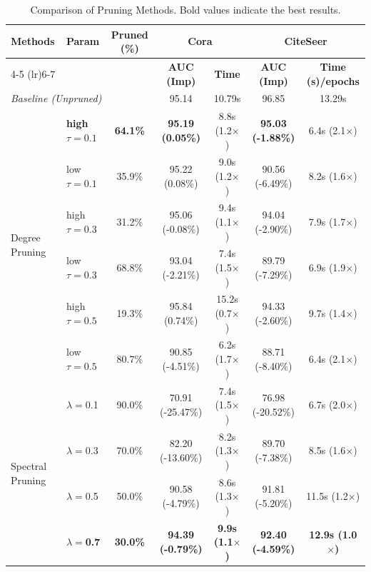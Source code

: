 \documentclass[pdflatex,sn-mathphys-num]{sn-jnl}%
\theoremstyle{thmstyleone}%
\theoremstyle{thmstyletwo}%
\theoremstyle{thmstylethree}%
\theoremstyle{plain} %
\theoremstyle{definition} %
\theoremstyle{remark} %
\theoremstyle{plain} %
\begin{document}
\begin{table}[ht]
\centering
\caption{Comparison of Pruning Methods. Bold values indicate the best results.}
\label{tab:pruning_results}

\footnotesize 
\setlength{\tabcolsep}{3.5pt} 
\renewcommand{\arraystretch}{1.1}

\begin{tabular}{llccccc}
\toprule

\multirow{2}{*}{\textbf{Methods}} & \multirow{2}{*}{\textbf{Param}} & \multirow{2}{*}{\textbf{Pruned (\%)}} & \multicolumn{2}{c}{\textbf{Cora}} & \multicolumn{2}{c}{\textbf{CiteSeer}} \\
\cmidrule(lr){4-5} \cmidrule(lr){6-7} 
 & & & \textbf{AUC (Imp)} & \textbf{Time} & \textbf{AUC (Imp)} & \textbf{Time (s)/epochs} \\
\midrule
\multicolumn{3}{l}{\textit{Baseline (Unpruned)}} & 95.14 & 10.79s & 96.85 & 13.29s \\
\midrule
\multirow{6}{*}{Degree Pruning} 
 &  \textbf{high $\tau =0.1$}& \textbf{64.1\%} & \textbf{95.19 (0.05\%)} & 8.8s (1.2$\times$) & \textbf{95.03 (-1.88\%)} & 6.4s (2.1$\times$) \\
 & low  $\tau =0.1$ & 35.9\% & 95.22 (0.08\%) & 9.0s (1.2$\times$) & 90.56 (-6.49\%) & 8.2s (1.6$\times$) \\
 & high $\tau =0.3$ & 31.2\% & 95.06 (-0.08\%) & 9.4s (1.1$\times$) & 94.04 (-2.90\%) & 7.9s (1.7$\times$) \\
 & low $\tau  =0.3$& 68.8\% & 93.04 (-2.21\%) & 7.4s (1.5$\times$) & 89.79 (-7.29\%) & 6.9s (1.9$\times$) \\
 & high $\tau  =0.5$ & 19.3\% & 95.84 (0.74\%) & 15.2s (0.7$\times$) & 94.33 (-2.60\%) & 9.7s (1.4$\times$) \\
 & low $\tau  =0.5$& 80.7\% & 90.85 (-4.51\%) & 6.2s (1.7$\times$) & 88.71 (-8.40\%) & 6.4s (2.1$\times$) \\
\midrule
\multirow{5}{*}{Spectral Pruning} 
 & $\lambda=$0.1 & 90.0\% & 70.91 (-25.47\%) & 7.4s (1.5$\times$) & 76.98 (-20.52\%) & 6.7s (2.0$\times$) \\
 & $\lambda=$0.3 & 70.0\% & 82.20 (-13.60\%) & 8.2s (1.3$\times$) & 89.70 (-7.38\%) & 8.5s (1.6$\times$) \\
 & $\lambda=$0.5 & 50.0\% & 90.58 (-4.79\%) & 8.6s (1.3$\times$) & 91.81 (-5.20\%) & 11.5s (1.2$\times$) \\
 & \textbf{$\lambda=$0.7} & \textbf{30.0\%} & \textbf{94.39 (-0.79\%)} & \textbf{9.9s (1.1$\times$)} & \textbf{92.40 (-4.59\%)} & \textbf{12.9s (1.0$\times$)} \\

\end{tabular}
\end{table}
\end{document}
